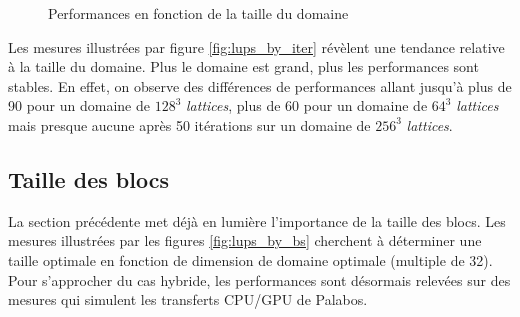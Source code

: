 \begin{figure}[H]
	\centering
	\caption{Performances en fonction de la taille du domaine}
	\label{fig:domain_size_bs}
\end{figure}

Les mesures illustrées par figure \ref{fig:lups_by_iter} révèlent une tendance relative à la taille du domaine. Plus le domaine est grand, plus les performances sont stables. En effet, on observe des différences de performances allant jusqu'à plus de 90  pour un domaine de $128^3$ \textit{lattices}, plus de 60  pour un domaine de $64^3$ \textit{lattices} mais presque aucune après 50 itérations sur un domaine de $256^3$ \textit{lattices}.

\subsection{Taille des blocs}
La section précédente met déjà en lumière l'importance de la taille des blocs. Les mesures illustrées par les figures \ref{fig:lups_by_bs} cherchent à déterminer une taille optimale en fonction de dimension de domaine optimale (multiple de 32). Pour s'approcher du cas hybride, les performances sont désormais relevées sur des mesures qui simulent les transferts \acs{CPU}/\acs{GPU} de Palabos.

